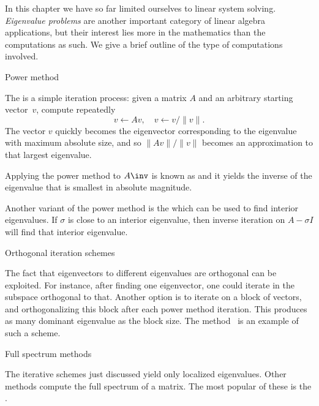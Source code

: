 
In this chapter we have so far limited ourselves to linear system
solving. \emph{Eigenvalue problems} are another important category of
linear algebra applications, but their interest lies more in the
mathematics than the computations as such.
We give a brief outline of the type of computations involved.

 {Power method}

The  is a simple iteration process:
%
given a matrix $A$ and an arbitrary starting vector~$v$, compute
repeatedly
\[ v\leftarrow Av,\quad v\leftarrow v/\|v\|. \]
The vector $v$ quickly becomes the eigenvector corresponding to the
eigenvalue with maximum absolute size, and so $\|Av\|/\|v\|$ becomes
an approximation to that largest eigenvalue.

Applying the power method to $A\inv$ is known as
%
and it yields the inverse of the eigenvalue that is smallest in
absolute magnitude.

Another variant of the power method is the
%
which can be used to find interior eigenvalues. If $\sigma$ is close
to an interior eigenvalue, then inverse iteration on $A-\sigma I$ will
find that interior eigenvalue.

 {Orthogonal iteration schemes}

The fact that eigenvectors to different eigenvalues are orthogonal can
be exploited. For instance, after finding one eigenvector, one could
iterate in the subspace orthogonal to that. Another option is to
iterate on a block of vectors, and orthogonalizing this block after
each power method iteration. This produces as many dominant eigenvalue
as the block size. The 
method~\cite{leho:95} is an example of such a scheme.

 {Full spectrum methods}

The iterative schemes just discussed yield only localized eigenvalues.
Other methods compute the full spectrum of a matrix. The most popular
of these is the .

